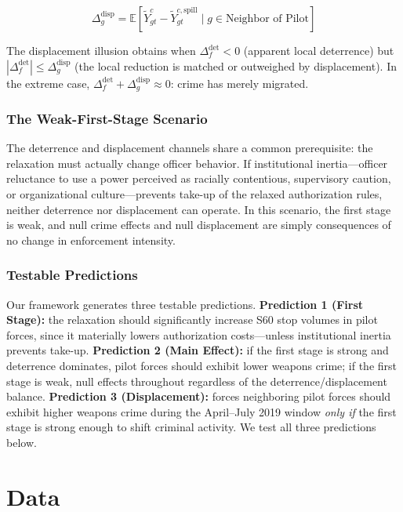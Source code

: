 \documentclass[12pt]{article}
\newcommand{\E}{\mathbb{E}}
\begin{document}
\begin{equation}
\Delta^{\text{disp}}_g = \E[\tilde{Y}^c_{gt} - \tilde{Y}^{c,\text{spill}}_{gt} \mid g \in \text{Neighbor of Pilot}]
\end{equation}

The displacement illusion obtains when $\Delta^{\text{det}}_f < 0$ (apparent local deterrence) but $|\Delta^{\text{det}}_f| \leq \Delta^{\text{disp}}_g$ (the local reduction is matched or outweighed by displacement). In the extreme case, $\Delta^{\text{det}}_f + \Delta^{\text{disp}}_g \approx 0$: crime has merely migrated.

\subsubsection*{The Weak-First-Stage Scenario}

The deterrence and displacement channels share a common prerequisite: the relaxation must actually change officer behavior. If institutional inertia---officer reluctance to use a power perceived as racially contentious, supervisory caution, or organizational culture---prevents take-up of the relaxed authorization rules, neither deterrence nor displacement can operate. In this scenario, the first stage is weak, and null crime effects and null displacement are simply consequences of no change in enforcement intensity.

\subsubsection*{Testable Predictions}

Our framework generates three testable predictions. \textbf{Prediction 1 (First Stage):} the relaxation should significantly increase S60 stop volumes in pilot forces, since it materially lowers authorization costs---unless institutional inertia prevents take-up. \textbf{Prediction 2 (Main Effect):} if the first stage is strong and deterrence dominates, pilot forces should exhibit lower weapons crime; if the first stage is weak, null effects throughout regardless of the deterrence/displacement balance. \textbf{Prediction 3 (Displacement):} forces neighboring pilot forces should exhibit higher weapons crime during the April--July 2019 window \emph{only if} the first stage is strong enough to shift criminal activity. We test all three predictions below.


\section{Data}
\label{sec:data}
\end{document}
